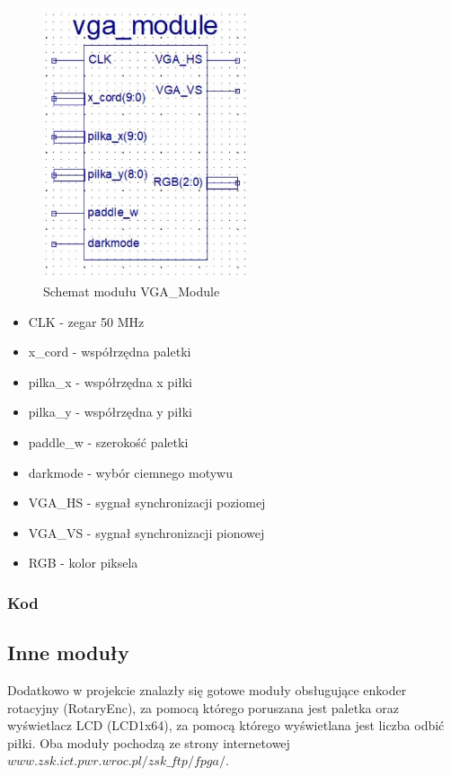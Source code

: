 \documentclass[12pt,a4paper]{article}
\begin{document}
\begin{figure}[ht]
    \centering
    \includegraphics[height=8cm]{vga_module.JPG}  
    \caption{Schemat modułu VGA\_Module}
    \label{fig:my_label}
\end{figure}
\begin{itemize}
    \item CLK - zegar 50 MHz
    \item x\_cord - współrzędna paletki
    \item pilka\_x - współrzędna x piłki
    \item pilka\_y - współrzędna y piłki
    \item paddle\_w - szerokość paletki
    \item darkmode - wybór ciemnego motywu
    \item VGA\_HS - sygnał synchronizacji poziomej
    \item VGA\_VS - sygnał synchronizacji pionowej
    \item RGB - kolor piksela
\end{itemize}

\subsubsection{Kod}
\lstset{style=vhdl}

\newpage

\lstset{style=vhdl}


\lstset{style=vhdl}


\subsection{Inne moduły}
Dodatkowo w projekcie znalazły się gotowe moduły obsługujące enkoder rotacyjny (RotaryEnc), za pomocą którego poruszana jest paletka oraz wyświetlacz LCD (LCD1x64), za pomocą którego wyświetlana jest liczba odbić piłki. Oba moduły pochodzą ze strony internetowej \newline$www.zsk.ict.pwr.wroc.pl/zsk\_ftp/fpga/$. 
\end{document}
